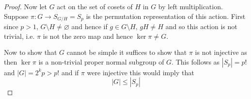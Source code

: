 \documentclass[12pt]{article}
\begin{document}
\begin{enumerate}
\begin{proof}
        Now let $G$ act on the set of cosets of $H$ in $G$ by left multiplication. Suppose $\pi: G \to S_{G/H} = S_p$ is the permutation representation
        of this action. First since $p > 1$, $G \setminus H \neq \varnothing$
        and hence if $g \in G \setminus H$, $gH \neq H$ and so this action is not trivial,
        i.e. $\pi$ is not the zero map and hence $\ker \pi \neq G$.

        Now to show that $G$ cannot be simple it suffices to show that $\pi$ is not injective
        as then $\ker \pi$ is a non-trivial proper normal subgroup of $G$. This follows as
        $|S_p| = p!$ and $|G| = 2^kp > p!$ and if $\pi$ were injective this would imply that
        \[ |G| \leq |S_p| \]
    \end{proof}
\end{enumerate}
\end{document}
